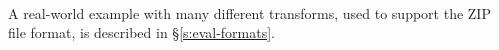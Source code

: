 \paragraph{}
A real-world example with many different transforms, used to support
the ZIP file format, is described in \S\ref{s:eval-formats}.







